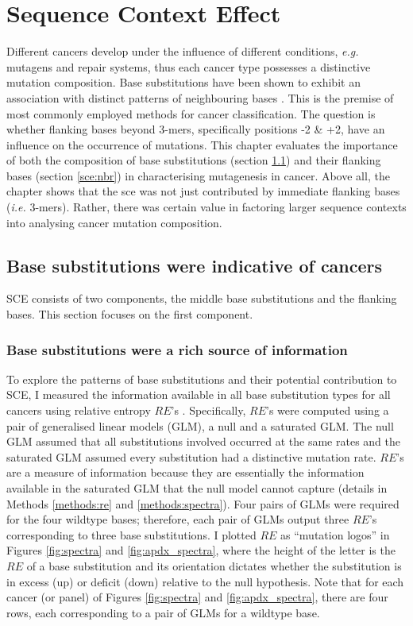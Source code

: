 \chapter{Sequence Context Effect}\label{sce}

Different cancers develop under the influence of different conditions, \textit{e.g.} mutagens and repair systems, thus each cancer type possesses a distinctive mutation composition. Base substitutions have been shown to exhibit an association with distinct patterns of neighbouring bases \citep{Zhu2017,Zhu2020,Vinson2012CGMethylation}. This is the premise of most commonly employed methods for cancer classification. The question is whether flanking bases beyond 3-mers, specifically positions -2 \& +2, have an influence on the occurrence of mutations. This chapter evaluates the importance of both the composition of base substitutions (section \ref{sce:spectra}) and their flanking bases (section \ref{sce:nbr}) in characterising mutagenesis in cancer. Above all, the chapter shows that the \gls{sce} was not just contributed by immediate flanking bases (\textit{i.e.} 3-mers). Rather, there was certain value in factoring larger sequence contexts into analysing cancer mutation composition.

\section{Base substitutions were indicative of cancers}\label{sce:spectra}
SCE consists of two components, the middle base substitutions and the flanking bases. This section focuses on the first component.

\subsection{Base substitutions were a rich source of information}
To explore the patterns of base substitutions and their potential contribution to SCE, I measured the information available in all base substitution types for all cancers using relative entropy $RE$'s \citep{Zhu2017}. Specifically, $RE$'s were computed using a pair of generalised linear models (GLM), a null and a saturated GLM. The null GLM assumed that all substitutions involved occurred at the same rates and the saturated GLM assumed every substitution had a distinctive mutation rate. $RE$'s are a measure of information because they are essentially the information available in the saturated GLM that the null model cannot capture (details in Methods \ref{methods:re} and \ref{methods:spectra}). Four pairs of GLMs were required for the four wildtype bases; therefore, each pair of GLMs output three $RE$'s corresponding to three base substitutions. I plotted $RE$ as ``mutation logos'' in Figures \ref{fig:spectra} and \ref{fig:apdx_spectra}, where the height of the letter is the $RE$ of a base substitution and its orientation dictates whether the substitution is in excess (up) or deficit (down) relative to the null hypothesis. Note that for each cancer (or panel) of Figures \ref{fig:spectra} and \ref{fig:apdx_spectra}, there are four rows, each corresponding to a pair of GLMs for a wildtype base. 

